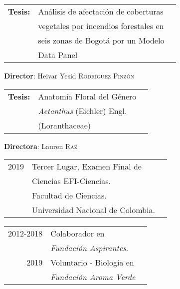 
\vspace{0.2mm}
\begin{tabular}{rll}
     \textbf{Tesis:} & Análisis de afectación de coberturas \\
     & vegetales por incendios forestales en \\ 
     & seis zonas de Bogotá por un Modelo \\
     & Data Panel
\end{tabular}
\textbf{Director}: Heivar Yesid \textsc{Rodríguez Pinzón}
\divider\smallskip

\begin{tabular}{rll}
     \textbf{Tesis:} & Anatomía Floral del Género \\
     & \emph{Aetanthus} (Eichler) Engl. \\ 
     & (Loranthaceae)
\end{tabular}
\textbf{Directora}: Lauren \textsc{Raz}

\begin{tabular}{rll}
   2019 & Tercer Lugar, Examen Final de\\
   &Ciencias EFI-Ciencias. \\
   & Facultad de Ciencias. \\
   & Universidad Nacional de Colombia.
\end{tabular}


\begin{tabular}{rll}
2012-2018 & Colaborador en \\
& \emph{Fundación Aspirantes}.\\
2019 & Voluntario - Biología en \\ 
& \emph{Fundación Aroma Verde}\\
\end{tabular}


